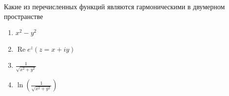 Какие из перечисленных функций являются гармоническими в двумерном пространстве

\begin{enumerate}[label=\arabic*)]
    \item \(x^2-y^2\)
    \item \(\operatorname{Re} e ^z(z=x+iy)\)
    \item \(\frac{1}{\sqrt{x^2+y^2}}\)
    \item \(\ln \left(\frac{1}{\sqrt{x^2+y^2}}\right)\)
\end{enumerate}

